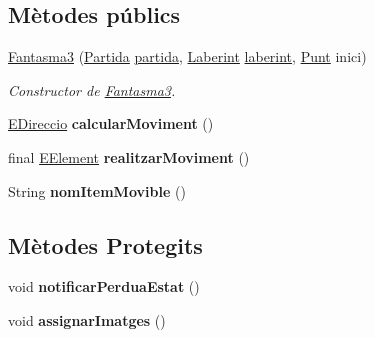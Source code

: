 \subsection*{Mètodes públics}
\begin{DoxyCompactItemize}
\item 
\hyperlink{classlogica_1_1_fantasma3_a282c4af4b988e9d0b43bc23f454ff72e}{Fantasma3} (\hyperlink{classlogica_1_1_partida}{Partida} \hyperlink{classlogica_1_1_item_movible_ace55b4918a7f671f89ed3109c91359e4}{partida}, \hyperlink{classlogica_1_1laberints_1_1_laberint}{Laberint} \hyperlink{classlogica_1_1_item_movible_a97036130b7376d77776427ca126f6fb5}{laberint}, \hyperlink{classlogica_1_1_punt}{Punt} inici)
\begin{DoxyCompactList}\small\item\em Constructor de \hyperlink{classlogica_1_1_fantasma3}{Fantasma3}. \end{DoxyCompactList}\item 
\hypertarget{classlogica_1_1_fantasma3_a91a5d6c42601d67d3696d733d1f8a8ee}{\hyperlink{enumlogica_1_1enumeracions_1_1_e_direccio}{E\+Direccio} {\bfseries calcular\+Moviment} ()}\label{classlogica_1_1_fantasma3_a91a5d6c42601d67d3696d733d1f8a8ee}

\item 
\hypertarget{classlogica_1_1_fantasma3_a7b70c6232bc51b5d11bcb54c6d19158f}{final \hyperlink{enumlogica_1_1enumeracions_1_1_e_element}{E\+Element} {\bfseries realitzar\+Moviment} ()}\label{classlogica_1_1_fantasma3_a7b70c6232bc51b5d11bcb54c6d19158f}

\item 
\hypertarget{classlogica_1_1_fantasma3_a4c111994855d2c11600f301de6a449fa}{String {\bfseries nom\+Item\+Movible} ()}\label{classlogica_1_1_fantasma3_a4c111994855d2c11600f301de6a449fa}

\end{DoxyCompactItemize}
\subsection*{Mètodes Protegits}
\begin{DoxyCompactItemize}
\item 
\hypertarget{classlogica_1_1_fantasma3_a409c7884b9d1f31392fe45786c7e1502}{void {\bfseries notificar\+Perdua\+Estat} ()}\label{classlogica_1_1_fantasma3_a409c7884b9d1f31392fe45786c7e1502}

\item 
\hypertarget{classlogica_1_1_fantasma3_aef966f328672a3faffa43a66d0520e6f}{void {\bfseries assignar\+Imatges} ()}\label{classlogica_1_1_fantasma3_aef966f328672a3faffa43a66d0520e6f}

\end{DoxyCompactItemize}
